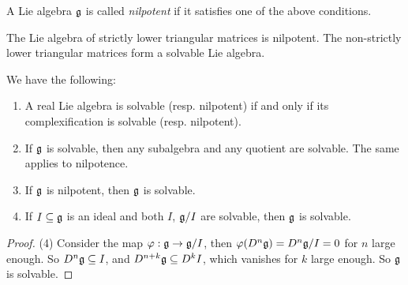 \begin{definition}
  A Lie algebra $\mathfrak{g}$ is called
  \emph{nilpotent} if it satisfies one of
  the above conditions.
\end{definition}

\begin{example}
  The Lie algebra of strictly
  lower triangular matrices is nilpotent.
  The non-strictly lower triangular
  matrices form a solvable Lie algebra.
\end{example}

\begin{theorem}
  We have the following:
  \begin{enumerate}
    \item A real Lie algebra is
      solvable (resp. nilpotent) if
      and only if its complexification
      is solvable (resp. nilpotent).
    \item If $\mathfrak{g}$ is solvable, then
      any subalgebra and any quotient
      are solvable. The same applies
      to nilpotence.
    \item If $\mathfrak{g}$ is nilpotent, then
      $\mathfrak{g}$ is solvable.
    \item If $I \subseteq \mathfrak{g}$ is an ideal
      and both $I$, $\mathfrak{g} / I$ are solvable,
      then $\mathfrak{g}$ is solvable.
  \end{enumerate}
\end{theorem}

\begin{proof}
  (4) Consider the map $\varphi : \mathfrak{g} \to \mathfrak{g} / I$,
  then $\varphi(D^n \mathfrak{g}) = D^n \mathfrak{g} / I = 0$
  for $n$ large enough. So
  $D^n \mathfrak{g} \subseteq I$, and
  $D^{n + k} \mathfrak{g} \subseteq D^k I$, which
  vanishes for $k$ large enough.
  So $\mathfrak{g}$ is solvable.
\end{proof}
